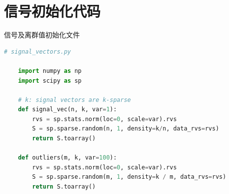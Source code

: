 \documentclass[AutoFakeBold]{LZUThesis}
\begin{document}
\section{信号初始化代码}

信号及离群值初始化文件

\begin{lstlisting}[language = python]
    # signal_vectors.py

    import numpy as np
    import scipy as sp
    
    # k: signal vectors are k-sparse
    def signal_vec(n, k, var=1):
        rvs = sp.stats.norm(loc=0, scale=var).rvs
        S = sp.sparse.random(n, 1, density=k/n, data_rvs=rvs)
        return S.toarray()

    def outliers(m, k, var=100):
        rvs = sp.stats.norm(loc=0, scale=var).rvs
        S = sp.sparse.random(m, 1, density=k / m, data_rvs=rvs)
        return S.toarray()
\end{lstlisting}



\Thanks

\Grade %
\end{document}
